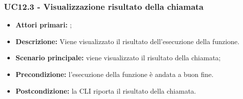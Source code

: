 \subsubsection{UC12.3 - Visualizzazione risultato della chiamata}
\begin{itemize}
	\item \textbf{Attori primari:} \ua{};
	\item \textbf{Descrizione:} Viene visualizzato il risultato dell'esecuzione della funzione. 
	\item \textbf{Scenario principale:} viene visualizzato il risultato della chiamata;
	\item \textbf{Precondizione:} l’esecuzione della funzione è andata a buon fine. 
	\item \textbf{Postcondizione:} la CLI riporta il risultato della chiamata.  
\end{itemize}